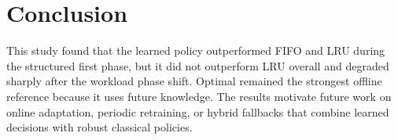 \documentclass[10pt,twocolumn,a4paper]{article}
\begin{document}
\section{Conclusion}
This study found that the learned policy outperformed FIFO and LRU during the structured first phase, but it did not outperform LRU overall and degraded sharply after the workload phase shift. Optimal remained the strongest offline reference because it uses future knowledge. The results motivate future work on online adaptation, periodic retraining, or hybrid fallbacks that combine learned decisions with robust classical policies.

{\footnotesize


}
\end{document}
